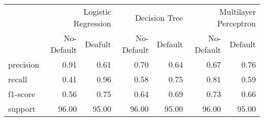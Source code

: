 \begin{table}
\thcenter
\begin{tabular}{lrrrrrr}
 & \multicolumn{2}{r}{Logistic Regression} & \multicolumn{2}{r}{Decision Tree  } & \multicolumn{2}{r}{Multilayer Perceptron} \\
 & No-Default & Deafult & No-Default & Default & No-Default & Default \\
precision & 0.91 & 0.61 & 0.70 & 0.64 & 0.67 & 0.76 \\
recall & 0.41 & 0.96 & 0.58 & 0.75 & 0.81 & 0.59 \\
f1-score & 0.56 & 0.75 & 0.64 & 0.69 & 0.73 & 0.66 \\
support & 96.00 & 95.00 & 96.00 & 95.00 & 96.00 & 95.00 \\
\end{tabular}
\end{table}
